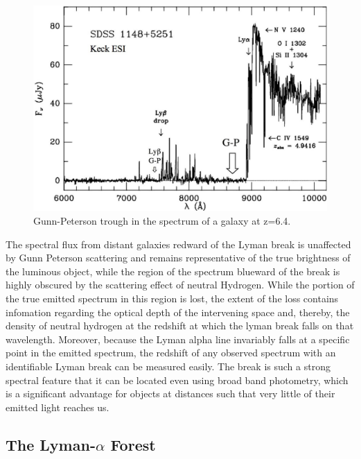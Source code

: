 \documentclass[pdf,color]{UoBnote}
\begin{document}
\begin{figure}[h]	\begin{center}
\includegraphics[scale=0.3]{images/dropout.jpg}
\caption{Gunn-Peterson trough in the spectrum of a galaxy at z=6.4.}\label{fig:dropout}
\end{center}		\end{figure}

The spectral flux from distant galaxies redward of the Lyman break is unaffected by Gunn Peterson scattering and remains representative of the true brightness of the luminous object, while the region of the spectrum blueward of the break is highly obscured by the scattering effect of neutral Hydrogen. While the portion of the true emitted spectrum in this region is lost, the extent of the loss contains infomation regarding the optical depth of the intervening space and, thereby, the density of neutral hydrogen at the redshift at which the lyman break falls on that wavelength. Moreover, because the Lyman alpha line invariably falls at a specific point in the emitted spectrum, the redshift of any observed spectrum with an identifiable Lyman break can be measured easily. The break is such a strong spectral feature that it can be located even using broad band photometry, which is a significant advantage for objects at distances such that very little of their emitted light reaches us.\\

\subsection{The Lyman-$\alpha$ Forest}	%
\end{document}
